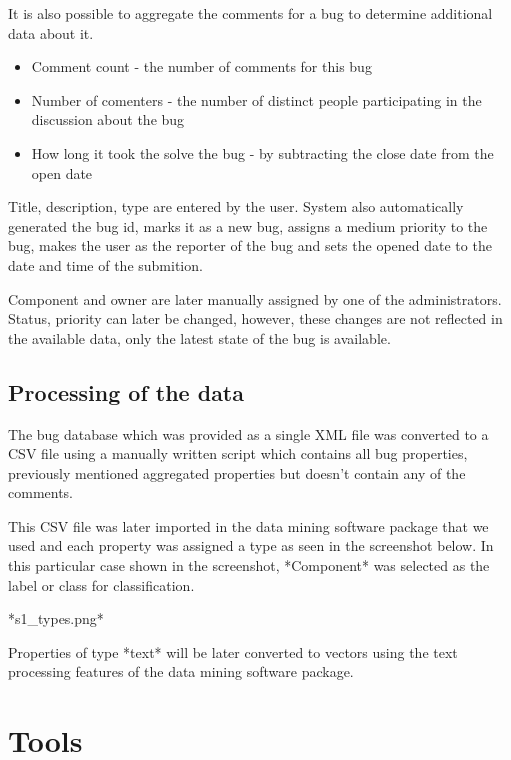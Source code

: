 It is also possible to aggregate the comments for a bug to determine additional data about it.

\begin{itemize}
\item Comment count - the number of comments for this bug
\item Number of comenters - the number of distinct people participating in the discussion about the bug
\item How long it took the solve the bug - by subtracting the close date from the open date
\end{itemize}

Title, description, type are entered by the user. System also automatically generated the bug id, marks it as a new bug, assigns a medium priority to the bug, makes the user as the reporter of the bug and sets the opened date to the date and time of the submition.

Component and owner are later manually assigned by one of the administrators. Status, priority can later be changed, however, these changes are not reflected in the available data, only the latest state of the bug is available.

\subsection*{Processing of the data} %

The bug database which was provided as a single XML file was converted to a CSV file using a manually written script which contains all bug properties, previously mentioned aggregated properties but doesn't contain any of the comments.

This CSV file was later imported in the data mining software package that we used and each property was assigned a type as seen in the screenshot below. In this particular case shown in the screenshot, *Component* was selected as the label or class for classification.

*s1\_types.png*

Properties of type *text* will be later converted to vectors using the text processing features of the data mining software package.



\section{Tools} %
\label{sub:Tools}

